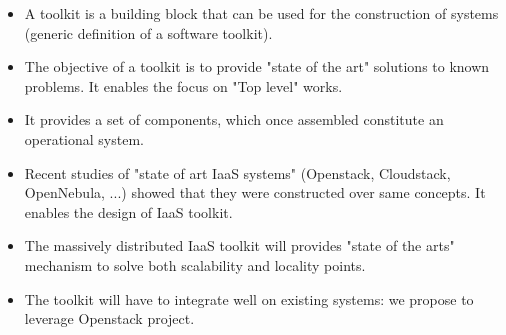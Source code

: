 \begin{itemize}

	\item A toolkit is a building block that can be used for the construction of
	systems (generic definition of a software toolkit).

	\item The objective of a toolkit is to provide "state of the art" solutions
	to known problems. It enables the focus on "Top level" works.

	\item It provides a set of components, which once assembled constitute an 
	operational system.

	\item Recent studies of "state of art IaaS systems" (Openstack, Cloudstack,
	OpenNebula, ...) showed that they were constructed over same concepts. It 
	enables the design of IaaS toolkit.

	\item The massively distributed IaaS toolkit will provides "state of the 
	arts" mechanism to solve both scalability and locality points.

	\item The toolkit will have to integrate well on existing systems: we 
	propose to leverage Openstack project.

\end{itemize}
